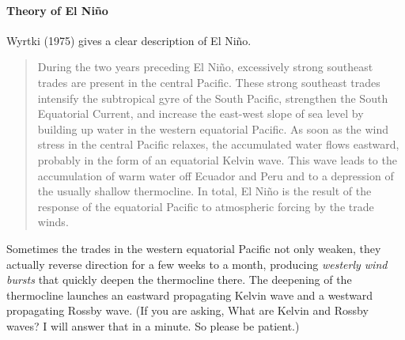 \paragraph{Theory of El Ni\~{n}o}
Wyrtki
(1975) gives a clear description of El Ni\~{n}o.
\begin{quote} \small
During the two years preceding El Ni\~{n}o, excessively strong
southeast trades are present in the central Pacific. These strong
southeast trades intensify the subtropical gyre of the South Pacific,
strengthen the South Equatorial Current, and increase the east-west
slope of sea level by building up water in the western equatorial
Pacific. As soon as the wind stress in
the central Pacific relaxes, the accumulated water flows eastward,
probably in the form of an equatorial Kelvin
wave. This wave leads to the accumulation of warm
water off Ecuador and Peru and to a depression of the usually shallow
thermocline. In total, El Ni\~{n}o is
the result of the response of the equatorial Pacific to atmospheric
forcing by the trade winds.
\end{quote}

Sometimes the trades in the western equatorial Pacific not only
weaken, they actually reverse direction for a few weeks to a month,
producing \textit{westerly wind bursts} that quickly deepen the
thermocline there. The deepening of the
thermocline launches an eastward
propagating Kelvin wave and a westward propagating
Rossby wave. (If you are asking, What are Kelvin
and Rossby waves? I will answer that in a minute. So please be
patient.)


